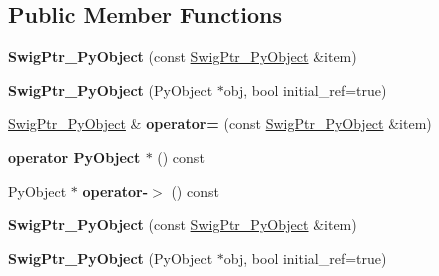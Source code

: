 \subsection*{Public Member Functions}
\begin{DoxyCompactItemize}
\item 
\hypertarget{classswig_1_1SwigPtr__PyObject_a4282f20207f8cd22c9b079203c832a04}{
{\bfseries SwigPtr\_\-PyObject} (const \hyperlink{classswig_1_1SwigPtr__PyObject}{SwigPtr\_\-PyObject} \&item)}
\label{d2/d50/classswig_1_1SwigPtr__PyObject_a4282f20207f8cd22c9b079203c832a04}

\item 
\hypertarget{classswig_1_1SwigPtr__PyObject_a4503d58d577d209f5e1fa67026852505}{
{\bfseries SwigPtr\_\-PyObject} (PyObject $\ast$obj, bool initial\_\-ref=true)}
\label{d2/d50/classswig_1_1SwigPtr__PyObject_a4503d58d577d209f5e1fa67026852505}

\item 
\hypertarget{classswig_1_1SwigPtr__PyObject_a86d8657d6b4a27c8e9e6942bc1ba572c}{
\hyperlink{classswig_1_1SwigPtr__PyObject}{SwigPtr\_\-PyObject} \& {\bfseries operator=} (const \hyperlink{classswig_1_1SwigPtr__PyObject}{SwigPtr\_\-PyObject} \&item)}
\label{d2/d50/classswig_1_1SwigPtr__PyObject_a86d8657d6b4a27c8e9e6942bc1ba572c}

\item 
\hypertarget{classswig_1_1SwigPtr__PyObject_aa2f1cdba0651c7a52482d225faef0574}{
{\bfseries operator PyObject $\ast$} () const }
\label{d2/d50/classswig_1_1SwigPtr__PyObject_aa2f1cdba0651c7a52482d225faef0574}

\item 
\hypertarget{classswig_1_1SwigPtr__PyObject_a97a20cad6a2b0916f39c45555fb559f0}{
PyObject $\ast$ {\bfseries operator-\/$>$} () const }
\label{d2/d50/classswig_1_1SwigPtr__PyObject_a97a20cad6a2b0916f39c45555fb559f0}

\item 
\hypertarget{classswig_1_1SwigPtr__PyObject_a4282f20207f8cd22c9b079203c832a04}{
{\bfseries SwigPtr\_\-PyObject} (const \hyperlink{classswig_1_1SwigPtr__PyObject}{SwigPtr\_\-PyObject} \&item)}
\label{d2/d50/classswig_1_1SwigPtr__PyObject_a4282f20207f8cd22c9b079203c832a04}

\item 
\hypertarget{classswig_1_1SwigPtr__PyObject_a4503d58d577d209f5e1fa67026852505}{
{\bfseries SwigPtr\_\-PyObject} (PyObject $\ast$obj, bool initial\_\-ref=true)}
\label{d2/d50/classswig_1_1SwigPtr__PyObject_a4503d58d577d209f5e1fa67026852505}


\end{DoxyCompactItemize}
